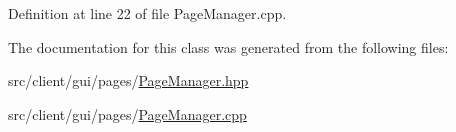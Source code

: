 Definition at line 22 of file Page\+Manager.\+cpp.



The documentation for this class was generated from the following files\+:\begin{DoxyCompactItemize}
\item 
src/client/gui/pages/\mbox{\hyperlink{_page_manager_8hpp}{Page\+Manager.\+hpp}}\item 
src/client/gui/pages/\mbox{\hyperlink{_page_manager_8cpp}{Page\+Manager.\+cpp}}\end{DoxyCompactItemize}
